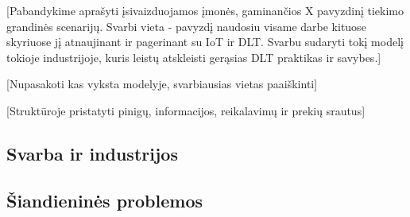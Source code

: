 [Pabandykime aprašyti įsivaizduojamos įmonės, gaminančios X pavyzdinį tiekimo grandinės scenarijų. Svarbi vieta - pavyzdį naudosiu visame darbe kituose skyriuose jį atnaujinant ir pagerinant su IoT ir DLT. Svarbu sudaryti tokį modelį tokioje industrijoje, kuris leistų atskleisti gerąsias DLT praktikas ir savybes.] 

[Nupasakoti kas vyksta modelyje, svarbiausias vietas paaiškinti]

[Struktūroje pristatyti pinigų, informacijos, reikalavimų ir prekių srautus]

\subsection{Svarba ir industrijos}

\subsection{Šiandieninės problemos}